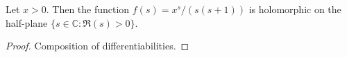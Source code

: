\begin{lemma}[isHolomorphicOn]
\label{isHolomorphicOn}
\leanok
Let $x>0$. Then the function $f(s) = x^s/(s(s+1))$ is holomorphic on the half-plane
  $\{s\in\mathbb{C}:\Re(s)>0\}$.
\end{lemma}
\begin{proof}
\leanok
Composition of differentiabilities.
\end{proof}
